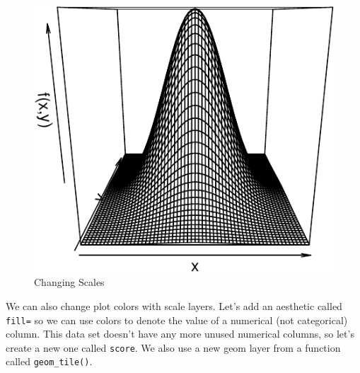 \documentclass[
  12pt,
  krantz2]{krantz}
\makeatletter
\newenvironment{Shaded}{\begin{snugshade}}{\end{snugshade}}
\newcommand{\AttributeTok}[1]{\textcolor[rgb]{0.61,0.61,0.61}{#1}}
\newcommand{\DecValTok}[1]{\textcolor[rgb]{0.06,0.06,0.06}{#1}}
\newcommand{\FunctionTok}[1]{\textcolor[rgb]{0,0,0}{#1}}
\newcommand{\NormalTok}[1]{#1}
\newcommand{\OtherTok}[1]{\textcolor[rgb]{0.37,0.37,0.37}{#1}}
\newcommand{\SpecialCharTok}[1]{\textcolor[rgb]{0,0,0}{#1}}
\newenvironment{kframe}{%
\medskip{}
\setlength{\fboxsep}{.8em}
 \def\at@end@of@kframe{}%
 \ifinner\ifhmode%
  \def\at@end@of@kframe{\end{minipage}}%
  \begin{minipage}{\columnwidth}%
 \fi\fi%
 \def\FrameCommand##1{\hskip\@totalleftmargin \hskip-\fboxsep
 \colorbox{shadecolor}{##1}\hskip-\fboxsep
     \hskip-\linewidth \hskip-\@totalleftmargin \hskip\columnwidth}%
 \MakeFramed {\advance\hsize-\width
   \@totalleftmargin\z@ \linewidth\hsize
   \@setminipage}}%
 {\par\unskip\endMakeFramed%
 \at@end@of@kframe}
\renewenvironment{Shaded}{\begin{kframe}}{\end{kframe}}
\makeatother
\begin{document}
\begin{figure}
\centering
\includegraphics{r_and_python_book_files/figure-latex/unnamed-chunk-223-1.pdf}
\caption{\label{fig:unnamed-chunk-223}Changing Scales}
\end{figure}

We can also change plot colors with scale layers. Let's add an aesthetic called \texttt{fill=} so we can use colors to denote the value of a numerical (not categorical) column. This data set doesn't have any more unused numerical columns, so let's create a new one called \texttt{score}. We also use a new geom layer from a function called \texttt{geom\_tile()}.

\begin{Shaded}
\end{Shaded}
\end{document}
